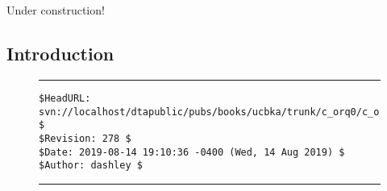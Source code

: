 
\chapter{\corqzerolongtitle{}}

\label{corq0}

                     {Under construction!}


\section{Introduction}



\vfill
\noindent\begin{figure}[!b]
\noindent\rule[-0.25in]{\textwidth}{1pt}
\begin{tiny}
\begin{verbatim}
$HeadURL: svn://localhost/dtapublic/pubs/books/ucbka/trunk/c_orq0/c_orq0.tex $
$Revision: 278 $
$Date: 2019-08-14 19:10:36 -0400 (Wed, 14 Aug 2019) $
$Author: dashley $
\end{verbatim}
\end{tiny}
\noindent\rule[0.25in]{\textwidth}{1pt}
\end{figure}
%
